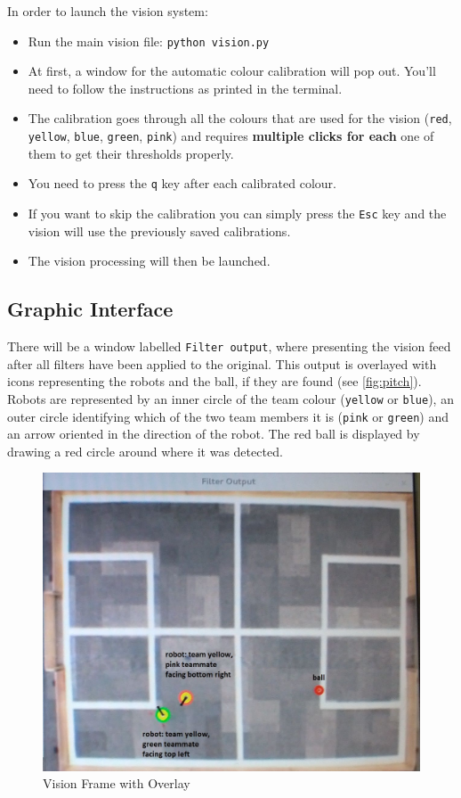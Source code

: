 In order to launch the vision system:
\begin{itemize}
\item Run the main vision file: \texttt{python vision.py}
\item At first, a window for the automatic colour calibration will pop out. You'll need to follow the instructions as printed in the terminal. 
\item The calibration goes through all the colours that are used for the vision (\texttt{red}, \texttt{yellow}, \texttt{blue}, \texttt{green}, \texttt{pink}) and requires \textbf{multiple clicks for each} one of them to get their thresholds properly.
\item You need to press the \texttt{q} key after each calibrated colour. 
\item If you want to skip the calibration you can simply press the \texttt{Esc} key and the vision will use the previously saved calibrations.
\item The vision processing will then be launched.
\end{itemize}

\subsection{Graphic Interface}
There will be a window labelled \texttt{Filter output}, where presenting the vision feed after all filters have been applied to the original. This output is overlayed with icons representing the robots and the ball, if they are found (see \autoref{fig:pitch}). Robots are represented by an inner circle of the team colour (\texttt{yellow} or \texttt{blue}), an outer circle identifying which of the two team members it is (\texttt{pink} or \texttt{green}) and an arrow oriented in the direction of the robot.  The red ball is displayed by drawing a red circle around where it was detected. 

\begin{figure}[H]
\centering
\includegraphics[scale=0.2]{vision_pitch}
\caption{Vision Frame with Overlay}
\label{fig:pitch}
\end{figure}

